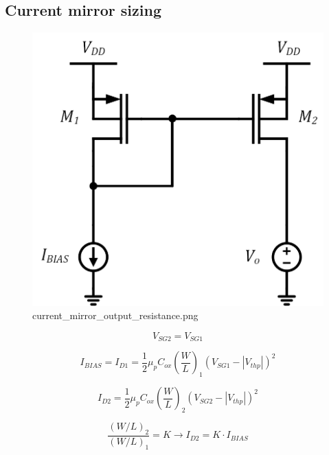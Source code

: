 \documentclass[11pt]{article}
\begin{document}
    \hypertarget{current-mirror-sizing}{%
\subsection{Current mirror sizing}\label{current-mirror-sizing}}

    \begin{figure}
\centering
\includegraphics{current_mirror_output_resistance.png}
\caption{current\_mirror\_output\_resistance.png}
\end{figure}

    \begin{equation}
V_{SG2} = V_{SG1}
\end{equation}

\begin{equation}
I_{BIAS} = I_{D1} = \dfrac{1}{2} \mu_p C_{ox}\left(\dfrac{W}{L}\right)_1 (V_{SG1} - |V_{thp}|)^2
\end{equation}

\begin{equation}
I_{D2} =  \dfrac{1}{2} \mu_p C_{ox}\left(\dfrac{W}{L}\right)_2 (V_{SG2} - |V_{thp}|)^2
\end{equation}

\begin{equation}
\dfrac{(W/L)_2}{(W/L)_1} = K \rightarrow \boxed{I_{D2} = K \cdot I_{BIAS}}
\end{equation}
\end{document}
